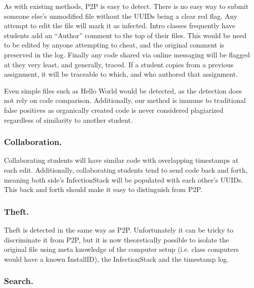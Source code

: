 \documentclass[10pt]{article}
\newcommand{\installID}{InstallID\xspace}
\newcommand{\infectionStack}{InfectionStack\xspace}
\begin{document}
		As with existing methods, P2P is easy to detect.  There is no easy way to submit someone else's unmodified file without the UUIDs being a clear red flag.  Any attempt to edit the file will mark it as infected.  Intro classes frequently have students add an ``Author'' comment to the top of their files.  This would be need to be edited by anyone attempting to cheat, and the original comment is preserved in the log. Finally any code shared via online messaging will be flagged at they very least, and generally, traced.   If a student copies from a previous assignment, it will be traceable to  which, and who authored that assignment.
		
		Even simple files such as Hello World would be detected, as the detection does not rely on code comparison. Additionally, our method is immune to traditional false positives as organically created code is never considered plagiarized regardless of similarity to another student.
	\subsubsection{Collaboration.\hspace{0.5em}\phantom{}}
	
		Collaborating students will have similar code with overlapping timestamps at each edit.  Additionally, collaborating students tend to send code back and forth, meaning both side's \infectionStack will be populated with each other's UUIDs.  This back and forth should make it easy to distinguish from P2P.
	\subsubsection{Theft.\hspace{0.5em}\phantom{}}
	
	Theft is detected in the same way as P2P.  Unfortunately it can be tricky to discriminate it from P2P, but it is now theoretically possible to isolate the original file using meta knowledge of the computer setup (i.e. class computers would have a known \installID), the \infectionStack and the timestamp log.  
	\subsubsection{Search.\hspace{0.5em}\phantom{}}
	
\end{document}

